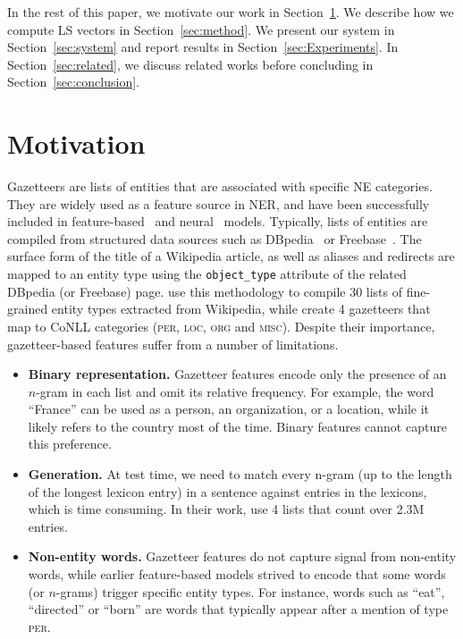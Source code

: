 \documentclass[11pt]{article}
\newcommand{\per}{\textsc{per}}
\newcommand{\loc}{\textsc{loc}}
\newcommand{\org}{\textsc{org}}
\newcommand{\misc}{\textsc{misc}}
\newcommand{\lr}{\textsc{LS}}
\begin{document}
	
	In the rest of this paper, we motivate our work in Section~\ref{sec:motivation}. We describe how we compute \lr{} vectors in Section~\ref{sec:method}. We present our system in Section~\ref{sec:system} and report results in Section~\ref{sec:Experiments}. In Section~\ref{sec:related}, we discuss related works before concluding in Section~\ref{sec:conclusion}.
	
	\section{Motivation}
	\label{sec:motivation}
	
	Gazetteers are lists of entities that are associated with specific NE categories. They are widely used as a feature source in NER, and have been successfully included in  feature-based~\cite{ratinov2009design} and neural~\cite{chiu2015named} models. Typically, lists of entities are compiled from structured data sources such as DBpedia~\cite{auer2007dbpedia} or Freebase~\cite{Bollacker:2008}. The surface form of the title of a Wikipedia article, as well as aliases and redirects are mapped to an entity type using the \texttt{object\_type} attribute of the related DBpedia (or Freebase) page.  use this methodology to compile 30 lists of fine-grained entity types extracted from Wikipedia, while  create 4 gazetteers that map to CoNLL categories (\per, \loc, \org{} and \misc). Despite their importance, gazetteer-based features suffer from a number of limitations.
	
	
	\begin{itemize}
		
		\item \textbf{Binary representation.} Gazetteer features encode only the presence of an $n$-gram in each list and omit its relative frequency. For example, the word \enquote{France} can be used as a person, an organization, or a location, while it likely refers to the country most of the time. Binary features cannot capture this preference. 
		
		\item \textbf{Generation.} At test time, we need to match every n-gram (up to the length of the longest lexicon entry) in a sentence against entries in the lexicons, which is time consuming. In their work,  use 4 lists that count over 2.3M entries.
		
		\item \textbf{Non-entity words.}	Gazetteer features do not capture signal from non-entity words, while earlier feature-based models strived to encode  that some words (or $n$-grams) trigger specific entity types.  For instance, words such as \enquote{eat}, \enquote{directed} or \enquote{born} are words that typically appear after a mention of type \per.
		
	\end{itemize}
	
\end{document}
